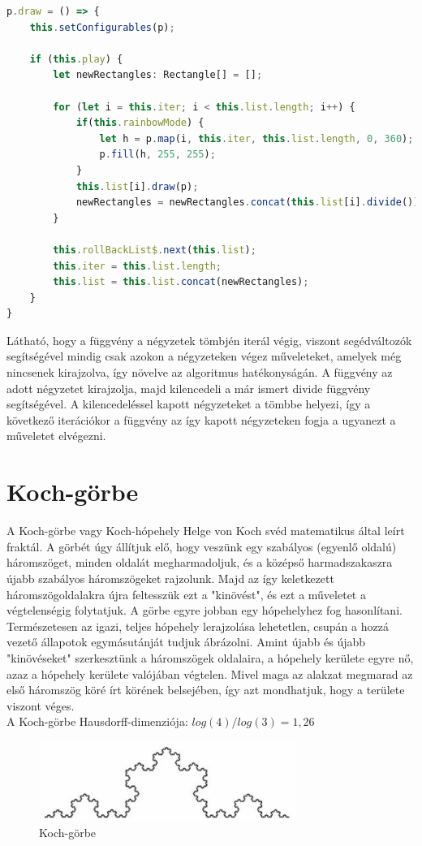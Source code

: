 \begin{lstlisting}[language=typescript]
p.draw = () => {
	this.setConfigurables(p);

	if (this.play) {
		let newRectangles: Rectangle[] = [];
		
		for (let i = this.iter; i < this.list.length; i++) {
			if(this.rainbowMode) {
				let h = p.map(i, this.iter, this.list.length, 0, 360);
				p.fill(h, 255, 255);
			}
			this.list[i].draw(p);
			newRectangles = newRectangles.concat(this.list[i].divide());
		}
		
		this.rollBackList$.next(this.list);
		this.iter = this.list.length;
		this.list = this.list.concat(newRectangles);
	}
}
\end{lstlisting}
Látható, hogy a függvény a négyzetek tömbjén iterál végig, viszont segédváltozók segítségével mindig csak azokon a négyzeteken végez műveleteket, amelyek még nincsenek kirajzolva, így növelve az algoritmus hatékonyságán. A függvény az adott négyzetet kirajzolja, majd kilencedeli a már ismert divide függvény segítségével. A kilencedeléssel kapott négyzeteket a tömbbe helyezi, így a következő iterációkor a függvény az így kapott négyzeteken fogja a ugyanezt a műveletet elvégezni.


\section*{Koch-görbe}
A Koch-görbe vagy Koch-hópehely Helge von Koch svéd matematikus által leírt fraktál. A görbét úgy állítjuk elő, hogy veszünk egy szabályos (egyenlő oldalú) háromszöget, minden oldalát megharmadoljuk, és a középső harmadszakaszra újabb szabályos háromszögeket rajzolunk. Majd az így keletkezett háromszögoldalakra újra feltesszük ezt a "kinövést", és ezt a műveletet a végtelenségig folytatjuk. A görbe egyre jobban egy hópehelyhez fog hasonlítani. Természetesen az igazi, teljes hópehely lerajzolása lehetetlen, csupán a hozzá vezető állapotok egymásutánját tudjuk ábrázolni. Amint újabb és újabb "kinövéseket" szerkesztünk a háromszögek oldalaira, a hópehely kerülete egyre nő, azaz a hópehely kerülete valójában végtelen. Mivel maga az alakzat megmarad az első háromszög köré írt körének belsejében, így azt mondhatjuk, hogy a területe viszont véges.\\
A Koch-görbe Hausdorff-dimenziója: $log(4)/log(3) = 1,26$
\begin{figure}[!ht]
	\begin{center}
		\includegraphics[width=0.75\textwidth]{img/KochCurve}
		\caption[labelInTOC]{Koch-görbe}
	\end{center}
\end{figure}
